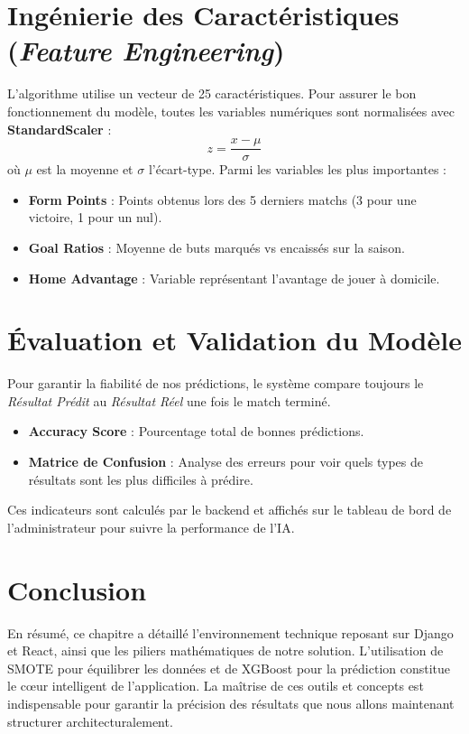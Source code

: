 \section{Ingénierie des Caractéristiques (\textit{Feature Engineering})}
L'algorithme utilise un vecteur de 25 caractéristiques. Pour assurer le bon fonctionnement du modèle, toutes les variables numériques sont normalisées avec \textbf{StandardScaler} :
\begin{equation}
    z = \frac{x - \mu}{\sigma}
\end{equation}
où $\mu$ est la moyenne et $\sigma$ l'écart-type. Parmi les variables les plus importantes :
\begin{itemize}
    \item \textbf{Form Points} : Points obtenus lors des 5 derniers matchs (3 pour une victoire, 1 pour un nul).
    \item \textbf{Goal Ratios} : Moyenne de buts marqués vs encaissés sur la saison.
    \item \textbf{Home Advantage} : Variable représentant l'avantage de jouer à domicile.
\end{itemize}

\section{Évaluation et Validation du Modèle}
Pour garantir la fiabilité de nos prédictions, le système compare toujours le \textit{Résultat Prédit} au \textit{Résultat Réel} une fois le match terminé.
\begin{itemize}
    \item \textbf{Accuracy Score} : Pourcentage total de bonnes prédictions.
    \item \textbf{Matrice de Confusion} : Analyse des erreurs pour voir quels types de résultats sont les plus difficiles à prédire.
\end{itemize}
Ces indicateurs sont calculés par le backend et affichés sur le tableau de bord de l'administrateur pour suivre la performance de l'IA.

\section*{Conclusion}
En résumé, ce chapitre a détaillé l'environnement technique reposant sur Django et React, ainsi que les piliers mathématiques de notre solution. L'utilisation de SMOTE pour équilibrer les données et de XGBoost pour la prédiction constitue le cœur intelligent de l'application. La maîtrise de ces outils et concepts est indispensable pour garantir la précision des résultats que nous allons maintenant structurer architecturalement.


